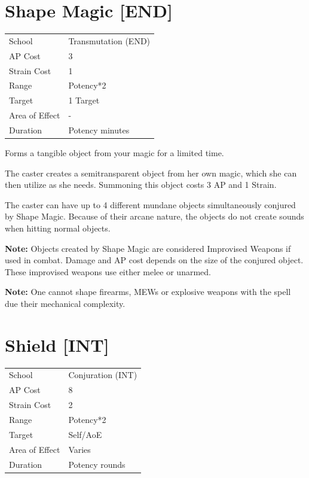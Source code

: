 \documentclass[11pt,a4paper,twocolumn]{book}
\begin{document}
\section*{Shape Magic [END]}

{
	\begin{tabu} to 75mm{| X[l,4] | X[l,7] |}
		\hline
		School 			& Transmutation (END) 	\\
        AP Cost	      	& 3 					\\
        Strain Cost     & 1 					\\
        Range     		& Potency*2				\\
        Target      	& 1 Target				\\
        Area of Effect  & -  	 				\\
        Duration     	& Potency minutes		\\ \hline
	\end{tabu}
		
}

\medskip

Forms a tangible object from your magic for a limited time.

The caster creates a semitransparent object from her own magic, which she can then utilize as she needs. Summoning this object costs 3 AP and 1 Strain.

The caster can have up to 4 different mundane objects simultaneously conjured by Shape Magic. Because of their arcane nature, the objects do not create sounds when hitting normal objects.

\textbf{Note:} Objects created by Shape Magic are considered Improvised Weapons if used in combat. Damage and AP cost depends on the size of the conjured object. These improvised weapons use either melee or unarmed.

\textbf{Note:} One cannot shape firearms, MEWs or explosive weapons with the spell due their mechanical complexity.

\vfill


\section*{Shield [INT]}
{
	\begin{tabu} to 75mm{| X[l,4] | X[l,7] |}
		\hline
		School 			& Conjuration (INT) 		\\
        AP Cost	      	& 8 						\\
        Strain Cost     & 2 						\\
        Range     		& Potency*2					\\
        Target      	& Self/AoE					\\
        Area of Effect  & Varies  	 				\\
        Duration     	& Potency rounds			\\ \hline
	\end{tabu}
		
}
\end{document}
